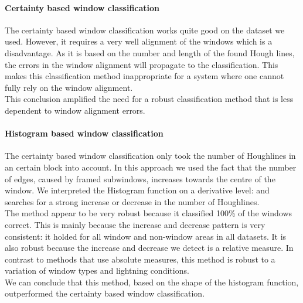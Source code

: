 	\paragraph{Certainty based window classification} %
	The certainty based window classification works quite good on
	the dataset we used.  However, it requires a very well alignment of the windows which
	is a disadvantage.  As it is based on the number and length of the found Hough lines, the
	errors in the window alignment will propagate to the classification.  This
	makes this classification method inappropriate for a system where one cannot
	fully rely on the window alignment.  \\
	This conclusion amplified the need for a robust classification method that is
	less dependent to window alignment errors. 

	\paragraph{Histogram based window classification} 
	The certainty based window classification only took the number of
	Houghlines in an certain block into account.
	In this approach we used 
	the fact that the number of edges, caused by framed subwindows, increases
	towards the centre of the window.
	We interpreted the Histogram function on a derivative level:
	and searches for a strong increase or decrease in the number of
	Houghlines. \\
	The method appear to be very robust because it classified 100\% of the windows correct.
	This is mainly because the increase and decrease pattern is very consistent: it
	holded for all window and non-window areas in all datasets.
	It is also robust because the increase and decrease we detect is a relative 
	measure. In contrast to methods that use absolute measures, this method is robust to a variation
	of window types and lightning conditions.\\

	We can conclude that this method, based on the shape of the histogram
	function, outperformed the certainty based window classification.

